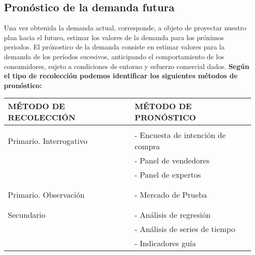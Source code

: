 \documentclass{templateNote}
\begin{document}
\subsection{Pronóstico de la demanda futura}
Una vez obtenida la demanda actual, corresponde, a objeto de proyectar nuestro plan hacia el futuro, estimar los valores de la demanda para los próximos periodos.
\newline
El prónostico de la demanda consiste en estimar valores para la demanda de los períodos sucesivos, anticipando el comportamiento de los consumidores, sujeto a condiciones de entorno y esfuerzo comercial dados.
\newline
\textbf{Según el tipo de recolección podemos identificar los siguientes métodos de pronóstico:}
\begin{table}[H]
  \centering
  \begin{tabular}{|l|l|}
    \hline
    \textbf{MÉTODO DE RECOLECCIÓN} & \textbf{MÉTODO DE PRONÓSTICO} \\
    \hline
    &\\
    Primario. Interrogativo & - Encuesta de intención de compra \\
    & - Panel de vendedores \\
    & - Panel de expertos \\
    &\\
    \hline
    &\\
    Primario. Observación & - Mercado de Prueba \\
    &\\
    \hline
    &\\
    Secundario & - Análisis de regresión \\
    & - Análisis de series de tiempo \\
    & - Indicadores guía \\
    \hline
  \end{tabular}
\end{table}

\newpage
\end{document}
